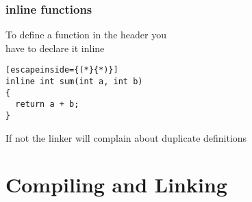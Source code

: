 \documentclass[14pt,a4paper,dvipsnames,usenames]{beamer}
\begin{document}
\begin{frame}[fragile]
  \frametitle{{\color{FeebleWeek}inline} functions}

  To define a function in the header you\\have to declare it {\color{FeebleWeek}inline}

  \vspace{.5em}
  \begin{lstlisting}[escapeinside={(*}{*)}]
inline int sum(int a, int b)
{
  return a + b;
}
  \end{lstlisting}

  \vspace{.5em}
  If not the linker will complain about duplicate definitions

  
\end{frame}

\section{Compiling and Linking}

\frame[plain]{\sectionpage}
\end{document}
